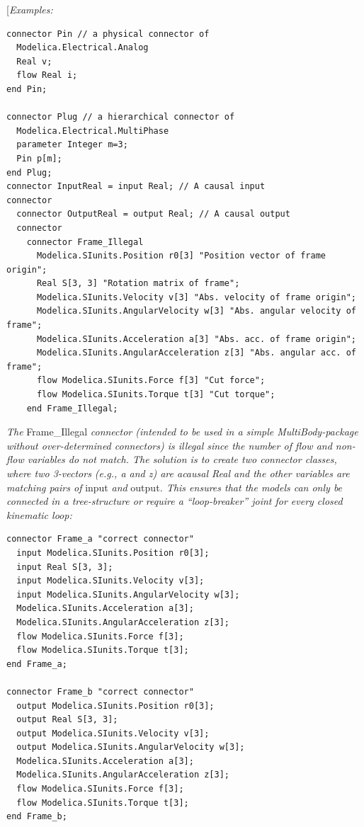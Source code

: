 \documentclass[10pt,a4paper]{report}
\begin{document}
{[}\emph{Examples:}

\begin{lstlisting}[language=modelica]
connector Pin // a physical connector of
  Modelica.Electrical.Analog
  Real v;
  flow Real i;
end Pin;

connector Plug // a hierarchical connector of
  Modelica.Electrical.MultiPhase
  parameter Integer m=3;
  Pin p[m];
end Plug;
connector InputReal = input Real; // A causal input
connector
  connector OutputReal = output Real; // A causal output
  connector
    connector Frame_Illegal
      Modelica.SIunits.Position r0[3] "Position vector of frame origin";
      Real S[3, 3] "Rotation matrix of frame";
      Modelica.SIunits.Velocity v[3] "Abs. velocity of frame origin";
      Modelica.SIunits.AngularVelocity w[3] "Abs. angular velocity of frame";
      Modelica.SIunits.Acceleration a[3] "Abs. acc. of frame origin";
      Modelica.SIunits.AngularAcceleration z[3] "Abs. angular acc. of frame";
      flow Modelica.SIunits.Force f[3] "Cut force";
      flow Modelica.SIunits.Torque t[3] "Cut torque";
    end Frame_Illegal;
\end{lstlisting}

\emph{The} Frame\_Illegal \emph{connector (intended to be used in a
simple MultiBody-package without over-determined connectors) is illegal
since the number of flow and non-flow variables do not match. The
solution is to create two connector classes, where two 3-vectors (e.g.,
a and z) are acausal Real and the other variables are matching pairs of}
input \emph{and} output\emph{. This ensures that the models can only be
connected in a tree-structure or require a ``loop-breaker'' joint for
every closed kinematic loop:}

\begin{lstlisting}[language=modelica]
connector Frame_a "correct connector"
  input Modelica.SIunits.Position r0[3];
  input Real S[3, 3];
  input Modelica.SIunits.Velocity v[3];
  input Modelica.SIunits.AngularVelocity w[3];
  Modelica.SIunits.Acceleration a[3];
  Modelica.SIunits.AngularAcceleration z[3];
  flow Modelica.SIunits.Force f[3];
  flow Modelica.SIunits.Torque t[3];
end Frame_a;

connector Frame_b "correct connector"
  output Modelica.SIunits.Position r0[3];
  output Real S[3, 3];
  output Modelica.SIunits.Velocity v[3];
  output Modelica.SIunits.AngularVelocity w[3];
  Modelica.SIunits.Acceleration a[3];
  Modelica.SIunits.AngularAcceleration z[3];
  flow Modelica.SIunits.Force f[3];
  flow Modelica.SIunits.Torque t[3];
end Frame_b;
\end{lstlisting}
\end{document}
